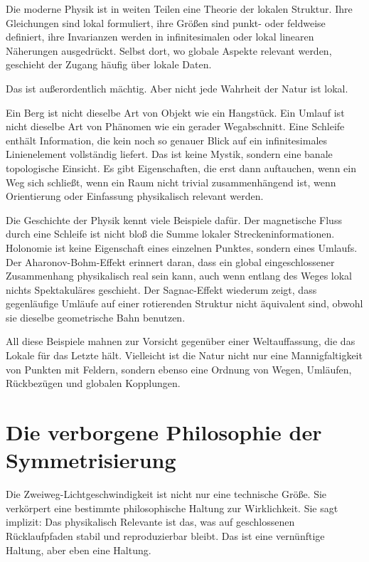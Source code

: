 \documentclass[11pt,a4paper]{article}
\theoremstyle{remark}
\begin{document}
	Die moderne Physik ist in weiten Teilen eine Theorie der lokalen Struktur. Ihre Gleichungen sind lokal formuliert, ihre Größen sind punkt- oder feldweise definiert, ihre Invarianzen werden in infinitesimalen oder lokal linearen Näherungen ausgedrückt. Selbst dort, wo globale Aspekte relevant werden, geschieht der Zugang häufig über lokale Daten.
	
	Das ist außerordentlich mächtig. Aber nicht jede Wahrheit der Natur ist lokal.
	
	Ein Berg ist nicht dieselbe Art von Objekt wie ein Hangstück. Ein Umlauf ist nicht dieselbe Art von Phänomen wie ein gerader Wegabschnitt. Eine Schleife enthält Information, die kein noch so genauer Blick auf ein infinitesimales Linienelement vollständig liefert. Das ist keine Mystik, sondern eine banale topologische Einsicht. Es gibt Eigenschaften, die erst dann auftauchen, wenn ein Weg sich schließt, wenn ein Raum nicht trivial zusammenhängend ist, wenn Orientierung oder Einfassung physikalisch relevant werden.
	
	Die Geschichte der Physik kennt viele Beispiele dafür. Der magnetische Fluss durch eine Schleife ist nicht bloß die Summe lokaler Streckeninformationen. Holonomie ist keine Eigenschaft eines einzelnen Punktes, sondern eines Umlaufs. Der Aharonov-Bohm-Effekt erinnert daran, dass ein global eingeschlossener Zusammenhang physikalisch real sein kann, auch wenn entlang des Weges lokal nichts Spektakuläres geschieht. Der Sagnac-Effekt wiederum zeigt, dass gegenläufige Umläufe auf einer rotierenden Struktur nicht äquivalent sind, obwohl sie dieselbe geometrische Bahn benutzen.
	
	All diese Beispiele mahnen zur Vorsicht gegenüber einer Weltauffassung, die das Lokale für das Letzte hält. Vielleicht ist die Natur nicht nur eine Mannigfaltigkeit von Punkten mit Feldern, sondern ebenso eine Ordnung von Wegen, Umläufen, Rückbezügen und globalen Kopplungen.
	
	\section{Die verborgene Philosophie der Symmetrisierung}
	
	Die Zweiweg-Lichtgeschwindigkeit ist nicht nur eine technische Größe. Sie verkörpert eine bestimmte philosophische Haltung zur Wirklichkeit. Sie sagt implizit: Das physikalisch Relevante ist das, was auf geschlossenen Rücklaufpfaden stabil und reproduzierbar bleibt. Das ist eine vernünftige Haltung, aber eben eine Haltung.
	
\end{document}
